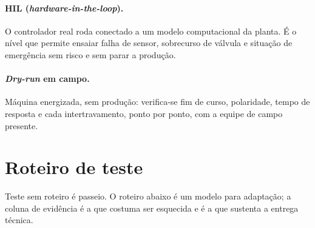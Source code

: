 \paragraph{HIL (\emph{hardware-in-the-loop}).} O controlador real roda conectado a um modelo
computacional da planta. É o nível que permite ensaiar falha de sensor, sobrecurso de válvula e
situação de emergência sem risco e sem parar a produção.

\paragraph{\emph{Dry-run} em campo.} Máquina energizada, sem produção: verifica-se fim de curso,
polaridade, tempo de resposta e cada intertravamento, ponto por ponto, com a equipe de campo
presente.

\section{Roteiro de teste}

Teste sem roteiro é passeio. O roteiro abaixo é um modelo para adaptação; a coluna de evidência é a
que costuma ser esquecida e é a que sustenta a entrega técnica.

